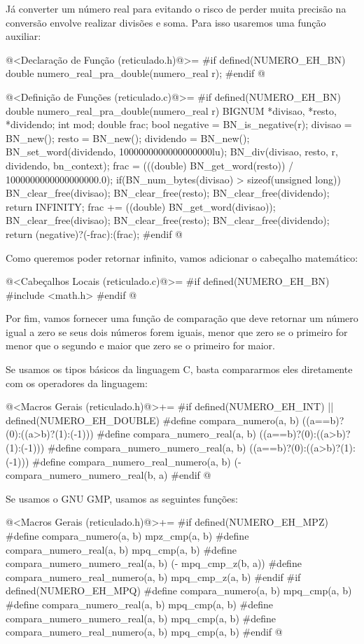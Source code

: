 Já converter um número real para  evitando o risco
de perder muita precisão na conversão envolve realizar divisões e
soma. Para isso usaremos uma função auxiliar:

\iniciocodigo
@<Declaração de Função (reticulado.h)@>=
#if defined(NUMERO_EH_BN)
double numero_real_pra_double(numero_real r);
#endif
@
\fimcodigo

\iniciocodigo
@<Definição de Funções (reticulado.c)@>=
#if defined(NUMERO_EH_BN)
double numero_real_pra_double(numero_real r){
  BIGNUM *divisao, *resto, *dividendo;
  int mod;
  double frac;
  bool negative = BN_is_negative(r);
  divisao = BN_new();
  resto = BN_new();
  dividendo = BN_new();
  BN_set_word(dividendo, 1000000000000000000lu);  
  BN_div(divisao, resto, r, dividendo, bn_context);
  frac = (((double) BN_get_word(resto)) / 1000000000000000000.0);
  if(BN_num_bytes(divisao) > sizeof(unsigned long)){
    BN_clear_free(divisao);
    BN_clear_free(resto);
    BN_clear_free(dividendo);
    return INFINITY;
  }
  frac += ((double) BN_get_word(divisao));
  BN_clear_free(divisao);
  BN_clear_free(resto);
  BN_clear_free(dividendo);
  return (negative)?(-frac):(frac);  
}
#endif
@

Como queremos poder retornar infinito, vamos adicionar o cabeçalho
matemático:

\iniciocodigo
@<Cabeçalhos Locais (reticulado.c)@>=
#if defined(NUMERO_EH_BN)
#include <math.h>
#endif
@
\fimcodigo

Por fim, vamos fornecer uma função de comparação que deve retornar um
número igual a zero se seus dois números forem iguais, menor que zero
se o primeiro for menor que o segundo e maior que zero se o primeiro
for maior.

Se usamos os tipos básicos da linguagem C, basta compararmos eles
diretamente com os operadores da linguagem:

\iniciocodigo
@<Macros Gerais (reticulado.h)@>+=
#if defined(NUMERO_EH_INT) || defined(NUMERO_EH_DOUBLE)
#define compara_numero(a, b) ((a==b)?(0):((a>b)?(1):(-1)))
#define compara_numero_real(a, b) ((a==b)?(0):((a>b)?(1):(-1)))
#define compara_numero_numero_real(a, b) ((a==b)?(0):((a>b)?(1):(-1)))
#define compara_numero_real_numero(a, b) (-compara_numero_numero_real(b, a)
#endif
@
\fimcodigo

Se usamos o GNU GMP, usamos as seguintes funções:

\iniciocodigo
@<Macros Gerais (reticulado.h)@>+=
#if defined(NUMERO_EH_MPZ)
#define compara_numero(a, b) mpz_cmp(a, b)
#define compara_numero_real(a, b) mpq_cmp(a, b)
#define compara_numero_numero_real(a, b) (- mpq_cmp_z(b, a))
#define compara_numero_real_numero(a, b) mpq_cmp_z(a, b)
#endif
#if defined(NUMERO_EH_MPQ)
#define compara_numero(a, b) mpq_cmp(a, b)
#define compara_numero_real(a, b) mpq_cmp(a, b)
#define compara_numero_numero_real(a, b) mpq_cmp(a, b)
#define compara_numero_real_numero(a, b) mpq_cmp(a, b)
#endif
@
\fimcodigo

